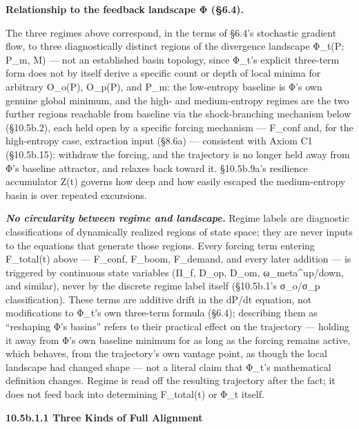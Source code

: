 \documentclass[
]{article}
\begin{document}
\textbf{Relationship to the feedback landscape Φ (§6.4).}

The three regimes above correspond, in the terms of §6.4's stochastic
gradient flow, to three diagnostically distinct regions of the
divergence landscape Φ\_t(P; P\_m, M) --- not an established basin
topology, since Φ\_t's explicit three-term form does not by itself
derive a specific count or depth of local minima for arbitrary O\_o(P),
O\_p(P), and P\_m: the low-entropy baseline is Φ's own genuine global
minimum, and the high- and medium-entropy regimes are the two further
regions reachable from baseline via the shock-branching mechanism below
(§10.5b.2), each held open by a specific forcing mechanism --- F\_conf
and, for the high-entropy case, extraction input (§8.6a) --- consistent
with Axiom C1 (§10.5b.15): withdraw the forcing, and the trajectory is
no longer held away from Φ's baseline attractor, and relaxes back toward
it. §10.5b.9a's resilience accumulator Z(t) governs how deep and how
easily escaped the medium-entropy basin is over repeated excursions.

\emph{\textbf{No circularity between regime and landscape.}} Regime
labels are diagnostic classifications of dynamically realized regions of
state space; they are never inputs to the equations that generate those
regions. Every forcing term entering F\_total(t) above --- F\_conf,
F\_boom, F\_demand, and every later addition --- is triggered by
continuous state variables (Π\_f, D\_op, D\_om, ω\_meta\^{}up/down, and
similar), never by the discrete regime label itself (§10.5b.1's
σ\_o/σ\_p classification). These terms are additive drift in the dP/dt
equation, not modifications to Φ\_t's own three-term formula (§6.4);
describing them as ``reshaping Φ's basins'' refers to their practical
effect on the trajectory --- holding it away from Φ's own baseline
minimum for as long as the forcing remains active, which behaves, from
the trajectory's own vantage point, as though the local landscape had
changed shape --- not a literal claim that Φ\_t's mathematical
definition changes. Regime is read off the resulting trajectory after
the fact; it does not feed back into determining F\_total(t) or Φ\_t
itself.

\textbf{10.5b.1.1 Three Kinds of Full Alignment}
\end{document}
